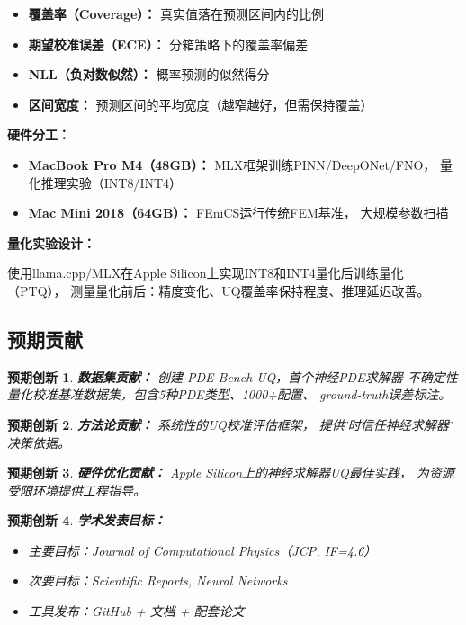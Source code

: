 \documentclass[12pt,a4paper,twoside]{article}
\newtheorem{innovation}{预期创新}[section]
\begin{document}
\begin{inversation}
\begin{itemize}
    \item \textbf{覆盖率（Coverage）：} 真实值落在预测区间内的比例
    \item \textbf{期望校准误差（ECE）：} 分箱策略下的覆盖率偏差
    \item \textbf{NLL（负对数似然）：} 概率预测的似然得分
    \item \textbf{区间宽度：} 预测区间的平均宽度（越窄越好，但需保持覆盖）
\end{itemize}

\textbf{硬件分工：}

\begin{itemize}
    \item \textbf{MacBook Pro M4（48GB）：} MLX框架训练PINN/DeepONet/FNO，
        量化推理实验（INT8/INT4）
    \item \textbf{Mac Mini 2018（64GB）：} FEniCS运行传统FEM基准，
        大规模参数扫描
\end{itemize}

\textbf{量化实验设计：}

使用llama.cpp/MLX在Apple Silicon上实现INT8和INT4量化后训练量化（PTQ），
测量量化前后：精度变化、UQ覆盖率保持程度、推理延迟改善。

\subsection{预期贡献}

\begin{innovation}
\textbf{数据集贡献：} 创建 PDE-Bench-UQ，首个神经PDE求解器
不确定性量化校准基准数据集，包含5种PDE类型、1000+配置、
ground-truth误差标注。
\end{innovation}

\begin{innovation}
\textbf{方法论贡献：} 系统性的UQ校准评估框架，
提供\"何时信任神经求解器\"的决策依据。
\end{innovation}

\begin{innovation}
\textbf{硬件优化贡献：} Apple Silicon上的神经求解器UQ最佳实践，
为资源受限环境提供工程指导。
\end{innovation}

\begin{innovation}
\textbf{学术发表目标：}
\begin{itemize}
    \item 主要目标：\textit{Journal of Computational Physics}（JCP, IF=4.6）
    \item 次要目标：\textit{Scientific Reports}, \textit{Neural Networks}
    \item 工具发布：GitHub + 文档 + 配套论文
\end{itemize}
\end{innovation}


\end{inversation}
\end{document}
